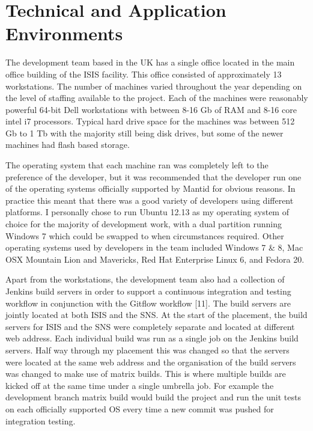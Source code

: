 \documentclass[paper=a4, fontsize=11pt]{scrartcl}	%
\numberwithin{equation}{section}															%
\numberwithin{figure}{section}																%
\numberwithin{table}{section}
\begin{document}
\section{Technical and Application
Environments}\label{technical-and-application-environments}

The development team based in the UK has a single office located in the
main office building of the ISIS facility. This office consisted of
approximately 13 workstations. The number of machines varied throughout
the year depending on the level of staffing available to the project.
Each of the machines were reasonably powerful 64-bit Dell workstations
with between 8-16 Gb of RAM and 8-16 core intel i7 processors. Typical
hard drive space for the machines was between 512 Gb to 1 Tb with the
majority still being disk drives, but some of the newer machines had
flash based storage.

The operating system that each machine ran was completely left to the
preference of the developer, but it was recommended that the developer
run one of the operating systems officially supported by Mantid for
obvious reasons. In practice this meant that there was a good variety of
developers using different platforms. I personally chose to run Ubuntu
12.13 as my operating system of choice for the majority of development
work, with a dual partition running Windows 7 which could be swapped to
when circumstances required. Other operating systems used by developers
in the team included Windows 7 \& 8, Mac OSX Mountain Lion and
Mavericks, Red Hat Enterprise Linux 6, and Fedora 20.

Apart from the workstations, the development team also had a collection of
Jenkins build servers in order to support a continuous integration and
testing workflow in conjunction with the Gitflow workflow {[}11{]}. The
build servers are jointly located at both ISIS and the SNS. At the start
of the placement, the build servers for ISIS and the SNS were completely
separate and located at different web address. Each individual build was
run as a single job on the Jenkins build servers. Half way through my
placement this was changed so that the servers were located at the same
web address and the organisation of the build servers was changed to
make use of matrix builds. This is where multiple builds are kicked
off at the same time under a single umbrella job. For example the
development branch matrix build would build the project and run the unit
tests on each officially supported OS every time a new commit was pushed
for integration testing.
\end{document}
